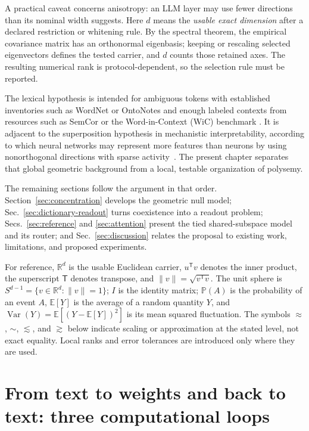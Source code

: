 \documentclass[
  aps,
  reprint,
  superscriptaddress,
  floatfix,
  nofootinbib,
  longbibliography
]{revtex4-2}
\newcommand{\R}{\mathbb{R}}
\newcommand{\E}{\mathbb{E}}
\newcommand{\Prob}{\mathbb{P}}
\newcommand{\Sph}[1]{S^{#1}}
\newcommand{\T}{^{\mathsf{T}}}
\newcommand{\norm}[1]{\lVert #1 \rVert}
\DeclareMathOperator{\Var}{Var}
\begin{document}
A practical caveat concerns anisotropy: an LLM layer may use fewer directions
than its nominal width suggests.  Here $d$ means the \emph{usable exact
dimension} after a declared restriction or whitening rule.  By the spectral
theorem, the empirical covariance matrix has an orthonormal eigenbasis; keeping
or rescaling selected eigenvectors defines the tested carrier, and $d$ counts
those retained axes.  The resulting numerical rank is protocol-dependent, so
the selection rule must be reported.

The lexical hypothesis is intended for ambiguous tokens with established
inventories such as WordNet or OntoNotes and enough labeled contexts from
resources such as SemCor or the Word-in-Context (WiC) benchmark
\cite{pilehvar2019wic}.  It is adjacent to the superposition hypothesis in
mechanistic interpretability, according to which neural networks may represent
more features than neurons by using nonorthogonal directions with sparse
activity~\cite{elhage2022superposition}.  The present chapter separates that
global geometric background from a local, testable organization of polysemy.

The remaining sections follow the argument in that order.
Section~\ref{sec:concentration} develops the geometric null model;
Sec.~\ref{sec:dictionary-readout} turns coexistence into a readout problem;
Secs.~\ref{sec:reference} and \ref{sec:attention} present the tied
shared-subspace model and its router; and Sec.~\ref{sec:discussion} relates the
proposal to existing work, limitations, and proposed experiments.

For reference, $\R^d$ is the usable Euclidean carrier, $u\T v$ denotes the
inner product, the superscript $\mathsf T$ denotes transpose, and
$\norm{v}=\sqrt{v\T v}$.  The unit sphere is
$\Sph{d-1}=\{v\in\R^d:\norm v=1\}$; $I$ is the identity matrix;
$\Prob(A)$ is the probability of an event $A$, $\E[Y]$ is the average of a
random quantity $Y$, and
$\Var(Y)=\E[(Y-\E[Y])^2]$ is its mean squared fluctuation.  The
symbols $\approx$, $\sim$, $\lesssim$, and $\gtrsim$ below indicate scaling or
approximation at the stated level, not exact equality.  Local ranks and error
tolerances are introduced only where they are used.

\section{From text to weights and back to text: three computational loops}
\label{sec:llm-loops}
\end{document}
